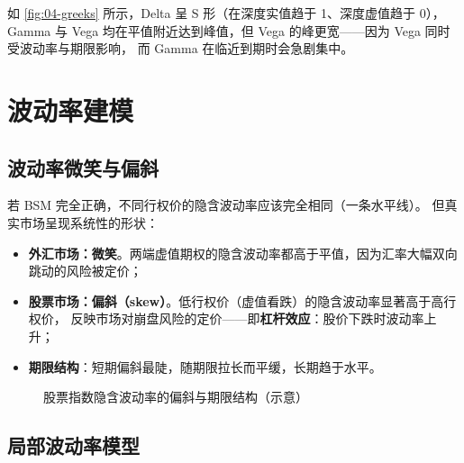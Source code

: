 如 \cref{fig:04-greeks} 所示，Delta 呈 S 形（在深度实值趋于 1、深度虚值趋于 0），
Gamma 与 Vega 均在平值附近达到峰值，但 Vega 的峰更宽——因为 Vega 同时受波动率与期限影响，
而 Gamma 在临近到期时会急剧集中。

\section{波动率建模}

\subsection{波动率微笑与偏斜}

若 BSM 完全正确，不同行权价的隐含波动率应该完全相同（一条水平线）。
但真实市场呈现系统性的形状：

\begin{itemize}[leftmargin=1.8em]
  \item \textbf{外汇市场：微笑}。两端虚值期权的隐含波动率都高于平值，因为汇率大幅双向跳动的风险被定价；
  \item \textbf{股票市场：偏斜（skew）}。低行权价（虚值看跌）的隐含波动率显著高于高行权价，
        反映市场对崩盘风险的定价——即\textbf{杠杆效应}：股价下跌时波动率上升；
  \item \textbf{期限结构}：短期偏斜最陡，随期限拉长而平缓，长期趋于水平。
\end{itemize}

\begin{figure}[htbp]
\centering
{}
\caption{股票指数隐含波动率的偏斜与期限结构（示意）}\label{fig:04-smile}
\end{figure}

\subsection{局部波动率模型}

